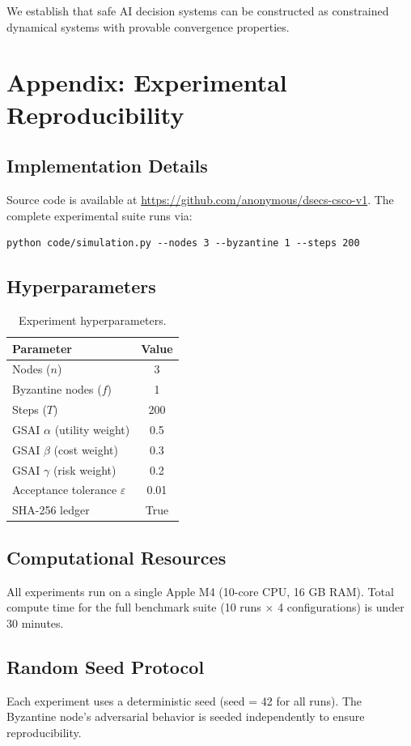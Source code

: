 \documentclass[11pt,letterpaper]{article}
\begin{document}
We establish that safe AI decision systems can be constructed as
constrained dynamical systems with provable convergence properties.




\appendix

\section{Appendix: Experimental Reproducibility}

\subsection{Implementation Details}

Source code is available at \url{https://github.com/anonymous/dsecs-csco-v1}.
The complete experimental suite runs via:
\begin{verbatim}
python code/simulation.py --nodes 3 --byzantine 1 --steps 200
\end{verbatim}

\subsection{Hyperparameters}

\begin{table}[h]
    \centering
    \caption{Experiment hyperparameters.}
    \label{tab:hyper}
    \begin{tabular}{lc}
        \toprule
        Parameter & Value \\
        \midrule
        Nodes ($n$) & 3 \\
        Byzantine nodes ($f$) & 1 \\
        Steps ($T$) & 200 \\
        GSAI $\alpha$ (utility weight) & 0.5 \\
        GSAI $\beta$ (cost weight) & 0.3 \\
        GSAI $\gamma$ (risk weight) & 0.2 \\
        Acceptance tolerance $\varepsilon$ & 0.01 \\
        SHA-256 ledger & True \\
        \bottomrule
    \end{tabular}
\end{table}

\subsection{Computational Resources}

All experiments run on a single Apple M4 (10-core CPU, 16 GB RAM).
Total compute time for the full benchmark suite (10 runs $\times$ 4
configurations) is under 30 minutes.

\subsection{Random Seed Protocol}

Each experiment uses a deterministic seed (seed = 42 for all runs).
The Byzantine node's adversarial behavior is seeded independently
to ensure reproducibility.
\end{document}
